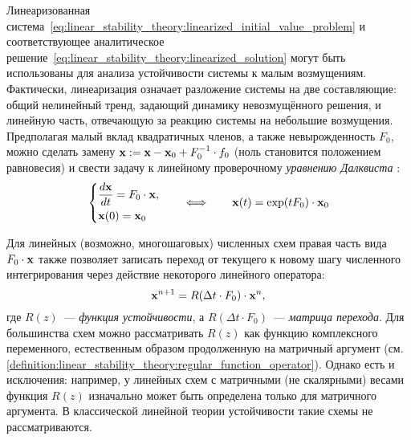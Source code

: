 Линеаризованная система~\eqref{eq:linear_stability_theory:linearized_initial_value_problem}
и соответствующее аналитическое решение~\eqref{eq:linear_stability_theory:linearized_solution}
могут быть использованы для анализа устойчивости системы к малым возмущениям.
Фактически, линеаризация означает разложение системы на две составляющие:
общий нелинейный тренд, задающий динамику невозмущённого решения,
и линейную часть, отвечающую за реакцию системы на небольшие возмущения.
Предполагая малый вклад квадратичных членов, а также невырожденность $ F_0 $,
можно сделать замену $ \mathbf{x}: = \mathbf{x} - \mathbf{x}_0 + F_0^{-1} \cdot f_0 $
(ноль становится положением равновесия)
и свести задачу к линейному проверочному \emph{уравнению Далквиста} \cite{dahlquist1963special}:
%
\begin{equation}
    \label{eq:linear_stability_theory:Dahlquist_equation}
    \begin{dcases}
        \dfrac{d \mathbf{x}}{d t} = F_0 \cdot \mathbf{x}, \\
        \mathbf{x}(0) = \mathbf{x}_0
    \end{dcases}
    \qquad
    \Longleftrightarrow
    \qquad
    \mathbf{x}(t) = \exp(t F_0) \cdot \mathbf{x}_0
\end{equation}

Для линейных (возможно, многошаговых) численных схем правая часть вида $ F_0 \cdot \mathbf{x} $
также позволяет записать переход от текущего к новому шагу численного интегрирования
через действие некоторого линейного оператора:
%
\begin{equation}
    \label{eq:stability_function}
    \mathbf{x}^{n+1} = R(\Delta t \cdot F_0) \cdot \mathbf{x}^n,
\end{equation}
%
где $ R(z) $~--- \emph{функция устойчивости}, а $ R(\Delta t \cdot F_0) $~--- \emph{матрица перехода}.
Для большинства схем можно рассматривать $ R(z) $ как функцию комплексного переменного,
естественным образом продолженную на матричный аргумент
(см. \ref{definition:linear_stability_theory:regular_function_operator}).
Однако есть и исключения:
например, у линейных схем с матричными (не скалярными) весами
функция $ R(z) $ изначально может быть определена только для матричного аргумента.
В классической линейной теории устойчивости такие схемы не рассматриваются.

